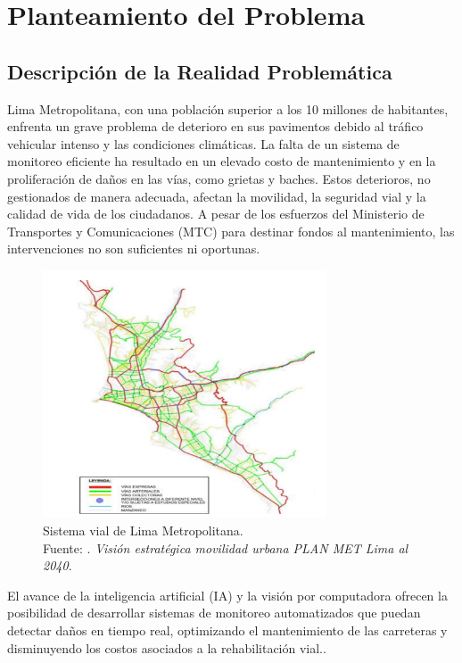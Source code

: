 	\chapter{Planteamiento del Problema}
	\section{Descripción de la Realidad Problemática}

	Lima Metropolitana, con una población superior a los 10 millones de habitantes, enfrenta un grave problema de deterioro en sus pavimentos debido al tráfico vehicular intenso y las condiciones climáticas. La falta de un sistema de monitoreo eficiente ha resultado en un elevado costo de mantenimiento y en la proliferación de daños en las vías, como grietas y baches. Estos deterioros, no gestionados de manera adecuada, afectan la movilidad, la seguridad vial y la calidad de vida de los ciudadanos. A pesar de los esfuerzos del Ministerio de Transportes y Comunicaciones (MTC) para destinar fondos al mantenimiento, las intervenciones no son suficientes ni oportunas.  \parencite{cielo2022gestion}
	\begin{figure}[H]
		\begin{center}
			\includegraphics[width=0.75\textwidth]{2/figures/sistemavial.png}
			\caption[Sistema vial de Lima Metropolitana.]{Sistema vial de Lima Metropolitana. \\
			Fuente: \cite{mivivienda2021movilidad}. \textit{Visión estratégica movilidad urbana PLAN MET Lima al 2040}.}
			\label{2:fig207-2}
		\end{center}
	\end{figure}

	
	El avance de la inteligencia artificial (IA) y la visión por computadora ofrecen la posibilidad de desarrollar sistemas de monitoreo automatizados que puedan detectar daños en tiempo real, optimizando el mantenimiento de las carreteras y disminuyendo los costos asociados a la rehabilitación vial.\parencite{9378047}.

